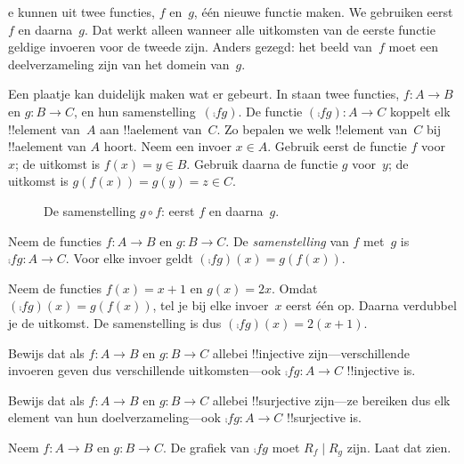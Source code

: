 \documentclass[../../../include/open-logic-section]{subfiles}
\begin{document}

\begin{explain}
e
kunnen uit twee functies, $f$ en~$g$, één nieuwe functie maken. We
gebruiken eerst $f$ en daarna~$g$. Dat werkt alleen wanneer alle
uitkomsten van de eerste functie geldige invoeren voor de tweede zijn.
Anders gezegd: het beeld van~$f$ moet een deelverzameling zijn van het
domein van~$g$.

Een plaatje kan duidelijk maken wat er gebeurt. In
 staan twee functies, $f \colon A \to B$ en
$g \colon B \to C$, en hun samenstelling~$(\comp{f}{g})$. De functie
$(\comp{f}{g}) \colon A \to C$ koppelt elk !!{element} van~$A$ aan
!!a{element} van~$C$. Zo bepalen we welk !!{element} van~$C$ bij
!!a{element} van $A$ hoort. Neem een invoer $x \in A$. Gebruik eerst
de functie $f$ voor~$x$; de uitkomst is $f(x) = y \in B$. Gebruik
daarna de functie $g$ voor~$y$; de uitkomst is $g(f(x)) = g(y) = z
\in C$.
\begin{figure}
  \caption{De samenstelling $g \circ f$: eerst $f$ en daarna~$g$.}
\end{figure}
\end{explain}

\begin{defn}[Samenstelling]
Neem de functies $f\colon A \to B$ en $g\colon B \to C$. De
\emph{samenstelling} van $f$ met~$g$ is $\comp{f}{g} \colon A \to C$.
Voor elke invoer geldt $(\comp{f}{g})(x) = g(f(x))$.
\end{defn}

\begin{ex}
Neem de functies $f(x) = x + 1$ en $g(x) = 2x$. Omdat
$(\comp{f}{g})(x) = g(f(x))$, tel je bij elke invoer~$x$ eerst één op.
Daarna verdubbel je de uitkomst. De samenstelling is dus
$(\comp{f}{g})(x) = 2(x+1)$.
\end{ex}

\begin{prob}
Bewijs dat als $f \colon A \to B$ en $g \colon B \to C$ allebei
!!{injective} zijn---verschillende invoeren geven dus verschillende
uitkomsten---ook $\comp{f}{g}\colon A \to C$ !!{injective} is.
\end{prob}

\begin{prob}
Bewijs dat als $f \colon A \to B$ en $g \colon B \to C$ allebei
!!{surjective} zijn---ze bereiken dus elk element van hun
doelverzameling---ook $\comp{f}{g}\colon A \to C$ !!{surjective} is.
\end{prob}

\begin{prob}
Neem $f \colon A \to B$ en $g \colon B \to C$. De grafiek van
$\comp{f}{g}$ moet $R_f \mid R_g$ zijn. Laat dat zien.
\end{prob}
\end{document}

